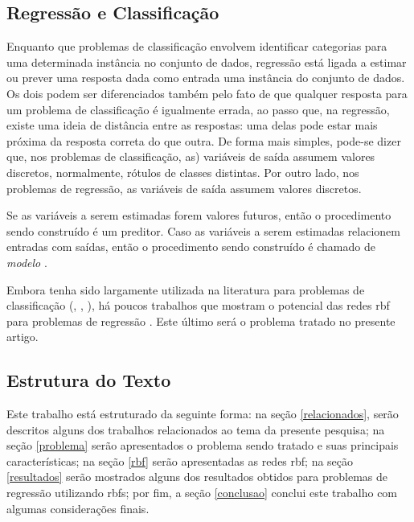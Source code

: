 \documentclass[conference]{IEEEtran}
\begin{document}
\subsection{Regressão e Classificação}
\label{regressaoxclassificacao}

Enquanto que problemas de classificação envolvem identificar categorias para 
uma determinada instância no conjunto de dados, regressão está ligada a estimar 
ou prever uma resposta dada como entrada uma instância do conjunto de dados. 
Os dois podem ser diferenciados também pelo fato de que qualquer resposta 
para um problema de classificação é igualmente errada, ao passo que, na 
regressão, existe uma ideia de distância entre as respostas: uma delas pode 
estar mais próxima da resposta correta do que outra. De forma mais simples, 
pode-se dizer que, nos problemas de classificação, as) variáveis de saída 
assumem valores discretos, normalmente, rótulos de classes distintas. Por outro 
lado, nos problemas de regressão, as variáveis de saída assumem valores 
discretos.

Se as variáveis a serem estimadas forem valores futuros, então o procedimento 
sendo construído é um preditor. Caso as variáveis a serem estimadas relacionem 
entradas com saídas, então o procedimento sendo construído é chamado de 
\textit{modelo} \cite{specht1991general}.

Embora tenha sido largamente utilizada na literatura para problemas de 
classificação (\cite{heartrbf}, \cite{wu2012using}, 
\cite{DBLP:conf/isnn/ZhaoYWWL06}), há poucos trabalhos que mostram o potencial 
das redes \ac*{rbf} para problemas de regressão \cite{rojas2002time}. Este 
último será o problema tratado no presente artigo.

\subsection{Estrutura do Texto}
\label{estrutura}

Este trabalho está estruturado da seguinte forma: na seção \ref{relacionados}, 
serão descritos alguns dos trabalhos relacionados ao tema da presente pesquisa; 
na seção \ref{problema} serão apresentados o problema sendo tratado e suas 
principais características; na seção \ref{rbf} serão apresentadas as redes 
\ac*{rbf}; na seção \ref{resultados} serão mostrados alguns dos resultados 
obtidos para problemas de regressão utilizando \acp*{rbf}; por fim, a seção 
\ref{conclusao} conclui este trabalho com algumas considerações finais.
\end{document}
